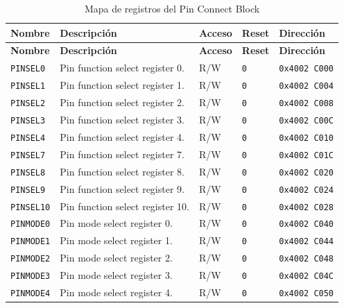 \begin{longtable}{|>{\raggedright\arraybackslash}p{}|>{\raggedright\arraybackslash}p{}|>{\centering\arraybackslash}p{}|>{\centering\arraybackslash}p{}|>{\raggedright\arraybackslash}p{}|}
\caption{Mapa de registros del Pin Connect Block}\\
\hline
\textbf{Nombre} & \textbf{Descripción} & \textbf{Acceso} & \textbf{Reset} & \textbf{Dirección} \\
\hline
\endfirsthead
\hline
\textbf{Nombre} & \textbf{Descripción} & \textbf{Acceso} & \textbf{Reset} & \textbf{Dirección} \\
\hline
\endhead
\texttt{PINSEL0} & Pin function select register 0. & R/W & \texttt{0} & \texttt{0x4002 C000} \\
\hline
\texttt{PINSEL1} & Pin function select register 1. & R/W & \texttt{0} & \texttt{0x4002 C004} \\
\hline
\texttt{PINSEL2} & Pin function select register 2. & R/W & \texttt{0} & \texttt{0x4002 C008} \\
\hline
\texttt{PINSEL3} & Pin function select register 3. & R/W & \texttt{0} & \texttt{0x4002 C00C} \\
\hline
\texttt{PINSEL4} & Pin function select register 4. & R/W & \texttt{0} & \texttt{0x4002 C010} \\
\hline
\texttt{PINSEL7} & Pin function select register 7. & R/W & \texttt{0} & \texttt{0x4002 C01C} \\
\hline
\texttt{PINSEL8} & Pin function select register 8. & R/W & \texttt{0} & \texttt{0x4002 C020} \\
\hline
\texttt{PINSEL9} & Pin function select register 9. & R/W & \texttt{0} & \texttt{0x4002 C024} \\
\hline
\texttt{PINSEL10} & Pin function select register 10. & R/W & \texttt{0} & \texttt{0x4002 C028} \\
\hline
\texttt{PINMODE0} & Pin mode select register 0. & R/W & \texttt{0} & \texttt{0x4002 C040} \\
\hline
\texttt{PINMODE1} & Pin mode select register 1. & R/W & \texttt{0} & \texttt{0x4002 C044} \\
\hline
\texttt{PINMODE2} & Pin mode select register 2. & R/W & \texttt{0} & \texttt{0x4002 C048} \\
\hline
\texttt{PINMODE3} & Pin mode select register 3. & R/W & \texttt{0} & \texttt{0x4002 C04C} \\
\hline
\texttt{PINMODE4} & Pin mode select register 4. & R/W & \texttt{0} & \texttt{0x4002 C050} \\

\end{longtable}
